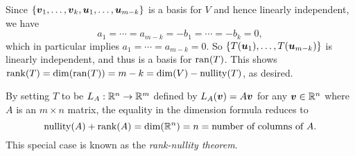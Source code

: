 \begin{enumerate}
\begin{pf}
Since \(\{\vb*{v}_1,\dotsc,\vb*{v}_k,\vb*{u}_1,\dotsc,\vb*{u}_{m-k}\}\) is
a basis for \(V\) and hence linearly independent, we have
\[
a_1=\dotsb=a_{m-k}=-b_1=\dotsb=-b_k=0,
\]
which in particular implies \(a_1=\dotsb=a_{m-k}=0\). So
\(\{T(\vb*{u}_1),\dotsc,T(\vb*{u}_{m-k})\}\) is linearly independent, and
thus is a basis for \(\operatorname{ran}(T)\). This shows
\(\operatorname{rank}(T)=\dim(\operatorname{ran}(T))=m-k=\dim(V)-\operatorname{nullity}(T)\), as desired.
\end{pf}

By setting \(T\) to be \(L_A:\mathbb{R}^n\to\mathbb{R}^m\) defined by
\(L_A(\vb*{v})=A\vb*{v}\) for any \(\vb*{v}\in\mathbb{R}^n\) where \(A\) is an
\(m\times n\) matrix, the equality in the dimension formula reduces to
\[
\operatorname{nullity}(A)+\operatorname{rank}(A)=\dim(\mathbb{R}^n)=n=\text{number of columns of \(A\)}.
\]
This special case is known as the \emph{rank-nullity theorem}.
\end{enumerate}
